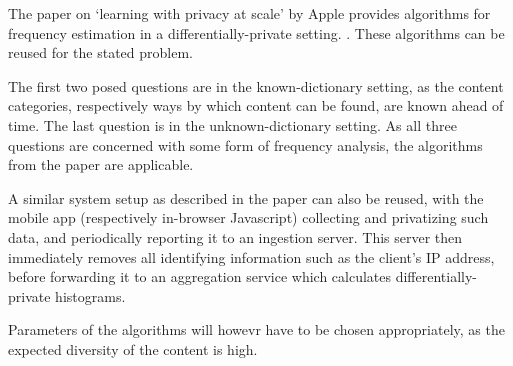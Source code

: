 \documentclass[a4paper]{scrreprt}
\begin{document}
The paper on `learning with privacy at scale' by Apple provides algorithms for
frequency estimation in a differentially-private setting.
\autocite{differentialprivacyteamappleLearningPrivacyScale}. These algorithms
can be reused for the stated problem.

The first two posed questions are in the known-dictionary setting, as the
content categories, respectively ways by which content can be found, are known
ahead of time. The last question is in the unknown-dictionary setting. As all
three questions are concerned with some form of frequency analysis, the
algorithms from the paper are applicable.

A similar system setup as described in the paper can also be reused, with the
mobile app (respectively in-browser Javascript) collecting and privatizing such
data, and periodically reporting it to an ingestion server. This server then
immediately removes all identifying information such as the client's IP
address, before forwarding it to an aggregation service which calculates
differentially-private histograms.

Parameters of the algorithms will howevr have to be chosen appropriately, as
the expected diversity of the content is high.

\printbibliography
\end{document}
